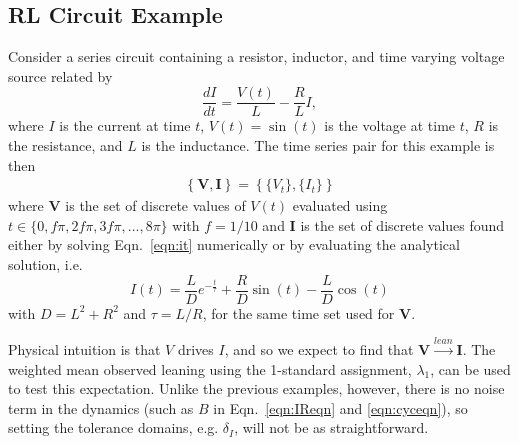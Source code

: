 \documentclass[twocolumn,aps,pre,groupedaddress]{revtex4-1}
\begin{document}
\subsection{RL Circuit Example}
\label{sec:rlcirc}
Consider a series circuit containing a resistor, inductor, and time varying voltage source related by
\begin{equation}
\label{eqn:it}
\frac{dI}{dt} = \frac{V(t)}{L} - \frac{R}{L} I,
\end{equation}
where $I$ is the current at time $t$, $V(t)= \sin\left(t\right)$ is the voltage at time $t$, $R$ is the resistance, and $L$ is the inductance.  The time series pair for this example is then 
\begin{eqnarray}
\label{eqn:RLcirceqn}
\left\{\mathbf{V},\mathbf{I}\right\} = \left\{\{V_t\},\{I_t\}\right\}
\end{eqnarray}
where $\mathbf{V}$ is the set of discrete values of $V(t)$ evaluated using $t\in\{0,f\pi,2f\pi,3f\pi,\ldots,8\pi\}$ with $f=1/10$ and $\mathbf{I}$ is the set of discrete values found either by solving Eqn.\ \ref{eqn:it} numerically or by evaluating the analytical solution, i.e.\
\begin{equation}
I(t) = \frac{L}{D}e^{-\frac{t}{\tau}}+\frac{R}{D}\sin(t)-\frac{L}{D}\cos(t)
\end{equation}
with $D = L^2 + R^2$ and $\tau = L/R$, for the same time set used for $\mathbf{V}$.

Physical intuition is that $V$ drives $I$, and so we expect to find that $\mathbf{V}\xrightarrow{lean}\mathbf{I}$.  The weighted mean observed leaning using the 1-standard assignment, $\lambda_1$, can be used to test this expectation.  Unlike the previous examples, however, there is no noise term in the dynamics (such as $B$ in Eqn.\ \ref{eqn:IReqn} and \ref{eqn:cyceqn}), so setting the tolerance domains, e.g. $\delta_I$, will not be as straightforward.  
\end{document}
